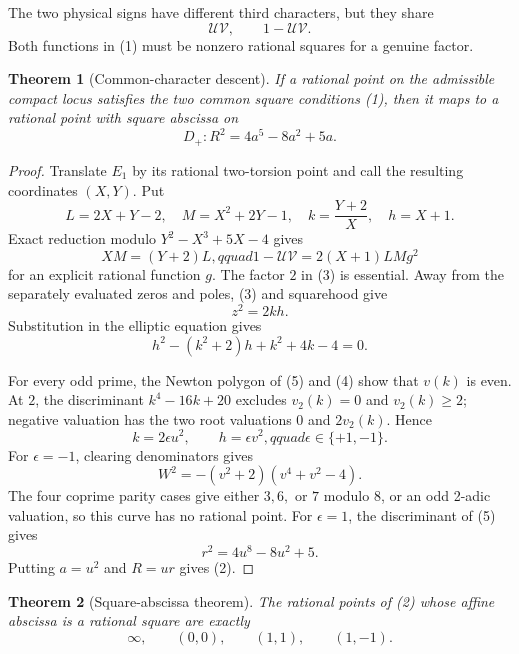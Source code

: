 \documentclass[11pt]{article}
\newtheorem{theorem}{Theorem}
\begin{document}
The two physical signs have different third characters, but they share
\[
 \mathcal U\mathcal V,\qquad 1-\mathcal U\mathcal V.       \tag{1}
\]
Both functions in (1) must be nonzero rational squares for a genuine factor.

\begin{theorem}[Common-character descent]
If a rational point on the admissible compact locus satisfies the two common
square conditions (1), then it maps to a rational point with square abscissa
on
\[
 D_+:R^2=4a^5-8a^2+5a.                                   \tag{2}
\]
\end{theorem}

\begin{proof}
Translate $E_1$ by its rational two-torsion point and call the resulting
coordinates $(X,Y)$.  Put
\[
 L=2X+Y-2,\quad M=X^2+2Y-1,\quad
 k=\frac{Y+2}{X},\quad h=X+1.
\]
Exact reduction modulo $Y^2-X^3+5X-4$ gives
\[
 XM=(Y+2)L,qquad
 1-\mathcal U\mathcal V=2(X+1)LMg^2                 \tag{3}
\]
for an explicit rational function $g$.  The factor $2$ in (3) is essential.
Away from the separately evaluated zeros and poles, (3) and squarehood give
\[
 z^2=2kh.                                                \tag{4}
\]
Substitution in the elliptic equation gives
\[
 h^2-(k^2+2)h+k^2+4k-4=0.                              \tag{5}
\]

For every odd prime, the Newton polygon of (5) and (4) show that $v(k)$ is
even.  At $2$, the discriminant $k^4-16k+20$ excludes $v_2(k)=0$ and
$v_2(k)\ge2$; negative valuation has the two root valuations $0$ and
$2v_2(k)$.  Hence
\[
 k=2\epsilon u^2,\qquad h=\epsilon v^2,qquad
 \epsilon\in\{+1,-1\}.                                \tag{6}
\]
For $\epsilon=-1$, clearing denominators gives
\[
 W^2=-(v^2+2)(v^4+v^2-4).
\]
The four coprime parity cases give either $3,6,$ or $7$ modulo $8$, or an odd
2-adic valuation, so this curve has no rational point.  For $\epsilon=1$,
the discriminant of (5) gives
\[
 r^2=4u^8-8u^2+5.
\]
Putting $a=u^2$ and $R=ur$ gives (2).
\end{proof}

\begin{theorem}[Square-abscissa theorem]
The rational points of (2) whose affine abscissa is a rational square are
exactly
\[
 \infty,\qquad (0,0),\qquad (1,1),\qquad(1,-1).          \tag{7}
\]
\end{theorem}
\end{document}
